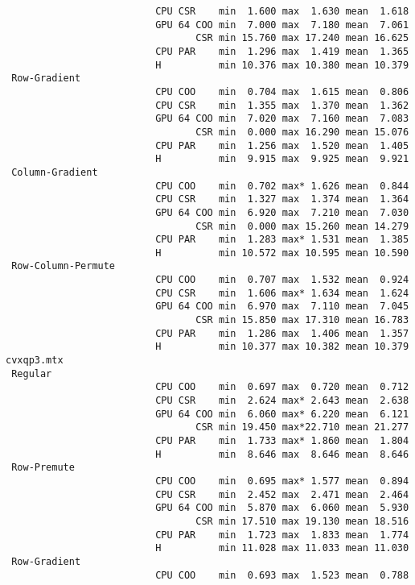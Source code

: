 {\begin{verbatim}
                          CPU CSR    min  1.600 max  1.630 mean  1.618
                          GPU 64 COO min  7.000 max  7.180 mean  7.061
                                 CSR min 15.760 max 17.240 mean 16.625
                          CPU PAR    min  1.296 max  1.419 mean  1.365
                          H          min 10.376 max 10.380 mean 10.379
 Row-Gradient
                          CPU COO    min  0.704 max  1.615 mean  0.806
                          CPU CSR    min  1.355 max  1.370 mean  1.362
                          GPU 64 COO min  7.020 max  7.160 mean  7.083
                                 CSR min  0.000 max 16.290 mean 15.076
                          CPU PAR    min  1.256 max  1.520 mean  1.405
                          H          min  9.915 max  9.925 mean  9.921
 Column-Gradient
                          CPU COO    min  0.702 max* 1.626 mean  0.844
                          CPU CSR    min  1.327 max  1.374 mean  1.364
                          GPU 64 COO min  6.920 max  7.210 mean  7.030
                                 CSR min  0.000 max 15.260 mean 14.279
                          CPU PAR    min  1.283 max* 1.531 mean  1.385
                          H          min 10.572 max 10.595 mean 10.590
 Row-Column-Permute
                          CPU COO    min  0.707 max  1.532 mean  0.924
                          CPU CSR    min  1.606 max* 1.634 mean  1.624
                          GPU 64 COO min  6.970 max  7.110 mean  7.045
                                 CSR min 15.850 max 17.310 mean 16.783
                          CPU PAR    min  1.286 max  1.406 mean  1.357
                          H          min 10.377 max 10.382 mean 10.379
cvxqp3.mtx
 Regular
                          CPU COO    min  0.697 max  0.720 mean  0.712
                          CPU CSR    min  2.624 max* 2.643 mean  2.638
                          GPU 64 COO min  6.060 max* 6.220 mean  6.121
                                 CSR min 19.450 max*22.710 mean 21.277
                          CPU PAR    min  1.733 max* 1.860 mean  1.804
                          H          min  8.646 max  8.646 mean  8.646
 Row-Premute
                          CPU COO    min  0.695 max* 1.577 mean  0.894
                          CPU CSR    min  2.452 max  2.471 mean  2.464
                          GPU 64 COO min  5.870 max  6.060 mean  5.930
                                 CSR min 17.510 max 19.130 mean 18.516
                          CPU PAR    min  1.723 max  1.833 mean  1.774
                          H          min 11.028 max 11.033 mean 11.030
 Row-Gradient
                          CPU COO    min  0.693 max  1.523 mean  0.788

\end{verbatim}}
